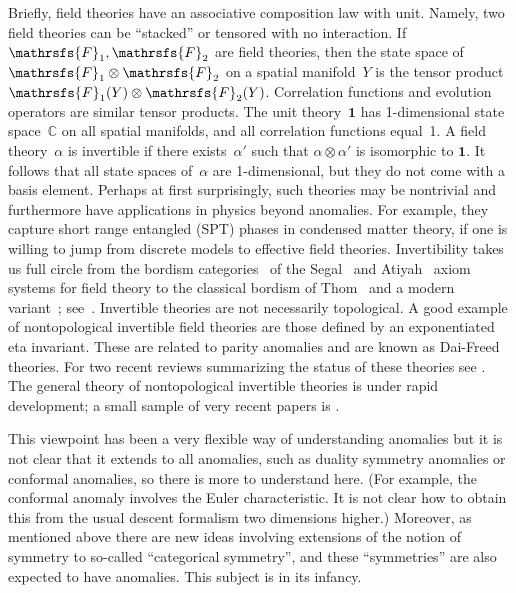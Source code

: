 \documentclass[12pt]{article}
\begin{document}
Briefly, field theories have an associative composition law with unit.  Namely, two field theories can be ``stacked'' or tensored with no interaction.  If $\mathrsfs{F}_1,\mathrsfs{F}_2$ are field theories, then the state space of $\mathrsfs{F}_1\otimes \mathrsfs{F}_2$ on a spatial manifold~$Y$ is the tensor product $\mathrsfs{F}_1(Y)\otimes \mathrsfs{F}_2(Y)$.  Correlation functions and evolution operators are similar tensor products.  The unit theory~$\boldsymbol{1}$ has 1-dimensional state space~$\mathbb{C}$ on all spatial manifolds, and all correlation functions equal~1.  A field theory~$\alpha$ is invertible if there exists~$\alpha'$ such that $\alpha\otimes \alpha'$ is isomorphic to $\boldsymbol{1}$.  It follows that all state spaces of~$\alpha$ are 1-dimensional, but they do not come with a basis element.  Perhaps at first surprisingly, such theories may be nontrivial and furthermore have applications in physics beyond anomalies.  For example, they  capture short range entangled (SPT) phases in condensed matter theory, if one is willing to jump from discrete models to effective field theories.  Invertibility takes us full circle from the bordism categories~\cite{Milnor} of the Segal~\cite{SegalCFT} and Atiyah~\cite{Atiyah} axiom systems for field theory to the classical bordism of Thom~\cite{Thom} and a modern variant~\cite{GMTW}; see~\cite{FHT,Freed:2016rqq}.  Invertible theories are not necessarily topological. A good example of nontopological invertible field theories are those defined by an exponentiated eta invariant. These are related to parity anomalies 
\cite{Redlich:1983kn,Redlich:1983dv,Niemi:1983rq,Alvarez-Gaume:1984zst} and are known as Dai-Freed theories. For two recent reviews summarizing the status of these theories see \cite{Witten:2019bou,Freed:2021wqa}.
The general theory of nontopological invertible theories is under rapid development; a small sample of very recent papers is \cite{YaYo,GY}.

This viewpoint has been a very flexible way of understanding anomalies but it is not clear that it extends to all anomalies, such as duality symmetry anomalies or conformal anomalies, so there is more to understand here.
(For example, the conformal anomaly involves the Euler characteristic. It is not clear how to obtain this from the usual descent formalism two dimensions higher.) Moreover, as  mentioned above there are new ideas involving extensions of the notion of symmetry to
so-called ``categorical symmetry'', and these ``symmetries'' are also expected to have anomalies.
This subject is in its infancy.
\end{document}
